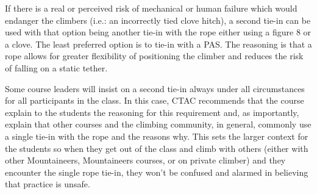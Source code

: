 \documentclass[nonacm,acmtog]{acmart}
\begin{document}
If there is a real or perceived risk of mechanical or human failure which would
endanger the climbers (i.e.: an incorrectly tied clove hitch), a second tie-in
can be used with that option being another tie-in with the rope either using a
figure 8 or a clove. The least preferred option is to tie-in with a PAS.  The
reasoning is that a rope allows for greater flexibility of positioning the
climber and reduces the risk of falling on a static tether.

Some course leaders will insist on a second tie-in always under all
circumstances for all participants in the class.  In this case, CTAC recommends
that the course explain to the students the reasoning for this requirement and,
as importantly, explain that other courses and the climbing community, in
general, commonly use a single tie-in with the rope and the reasons why. This
sets the larger context for the students so when they get out of the class and
climb with others (either with other Mountaineers, Mountaineers courses, or on
private climber) and they encounter the single rope tie-in, they won't be
confused and alarmed in believing that practice is unsafe.



\end{document}
